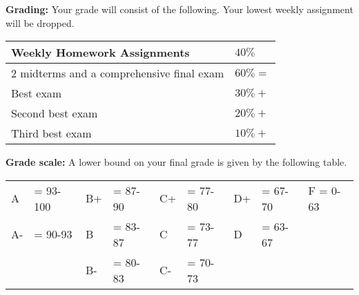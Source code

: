 \documentclass[12pt]{article}
\begin{document}




\noindent\textbf{Grading:} 
Your grade will consist of the following. Your lowest weekly assignment will be dropped.

\begin{center}
  \begin{tabular}{|l|l|}
    \hline
    Weekly Homework Assignments & $40\%$ \\
    \hline    
    2 midterms and a comprehensive final exam  & $60\% = $ 	 \\
    Best exam  & $30\% + $ 	 \\
    Second best exam& $20\% + $ 	 \\
    Third best exam & $10\% + $ 	 \\    
    \hline
  \end{tabular}
\end{center}

\vspace*{.15in}
\noindent\textbf{Grade scale:} 
A lower bound on your final grade is given by the following table. 

\begin{center}
  \begin{tabular}{|ll|ll|ll|ll|l|}
\hline
A  &\hspace{-3 pt}\hspace{-7 pt}= 93-100   &B+ &\hspace{-7 pt}= 87-90  &C+ &\hspace{-7 pt}= 77-80 & D+ &\hspace{-7 pt}= 67-70  & F = 0-63\\
A- &\hspace{-3 pt}\hspace{-7 pt}= 90-93    &B  &\hspace{-7 pt}= 83-87  & C &\hspace{-7 pt}= 73-77  & D  &\hspace{-7 pt}= 63-67 &\\
   &                         &B- &\hspace{-7 pt}= 80-83  &C- &\hspace{-7 pt}= 70-73 &    &        &\\
    \hline
  \end{tabular}
\end{center}
\end{document}
